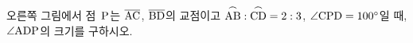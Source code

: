 \noindent\begin{minipage}[t]{0.58\linewidth}\vspace{0pt}\raggedright 오른쪽 그림에서 점~$\mathrm{P}$는 $\overline{\mathrm{AC}}$, $\overline{\mathrm{BD}}$의 교점이고 $\overset{\frown}{\mathrm{AB}}:\overset{\frown}{\mathrm{CD}}=2:3$, $\angle\mathrm{CPD}=100^\circ$일 때, $\angle\mathrm{ADP}$의 크기를 구하시오.\end{minipage}\hfill\begin{minipage}[t]{0.4\linewidth}\vspace{0pt}\centering \resizebox{\ifdim\width>\linewidth\linewidth\else\width\fi}{!}{}\end{minipage}\par
